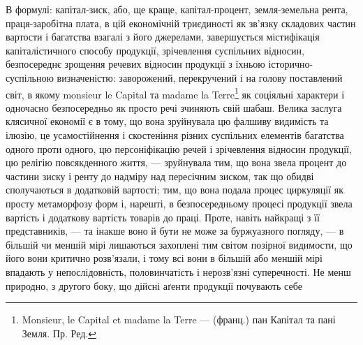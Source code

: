 В формулі: капітал-зиск, або, ще краще, капітал-процент, земля-земельна
рента, праця-заробітна плата, в цій економічній триєдиності як зв’язку
складових частин вартости і багатства взагалі з його джерелами, завершується
містифікація капіталістичного способу продукції, зрічевлення суспільних відносин,
безпосереднє зрощення речевих відносин продукції з їхньою історично-суспільною
визначеністю: заворожений, перекручений і на голову поставлений
світ, в якому monsieur le Capital та madame la Terre\footnote*{
Monsieur, le Capital et madame la Terre — (франц.) пан Капітал та пані Земля. Пр. Ред.
} як соціяльні характери
і одночасно безпосередньо як просто речі зчиняють свій шабаш. Велика заслуга
клясичної економії є в тому, що вона зруйнувала цю фалшиву видимість
та ілюзію, це усамостійнення і скостеніння різних суспільних елементів
багатства одного проти одного, цю персоніфікацію речей і зрічевлення
відносин продукції, цю релігію повсякденного життя, — зруйнувала тим, що вона
звела процент до частини зиску і ренту до надміру над пересічним зиском, так
що обидві сполучаються в додатковій вартості; тим, що вона подала процес
циркуляції як просту метаморфозу форм і, нарешті, в безпосередньому процесі
продукції звела вартість і додаткову вартість товарів до праці. Проте, навіть
найкращі з її представників, — та інакше воно й бути не може за буржуазного
погляду, — в більшій чи меншій мірі лишаються захоплені тим світом позірної
видимости, що його вони критично розв’язали, і тому всі вони в більшій або меншій
мірі впадають у непослідовність, половинчатість і нерозв’язні суперечності.
Не менш природно, з другого боку, що дійсні аґенти продукції почувають себе
\parbreak{}  %
